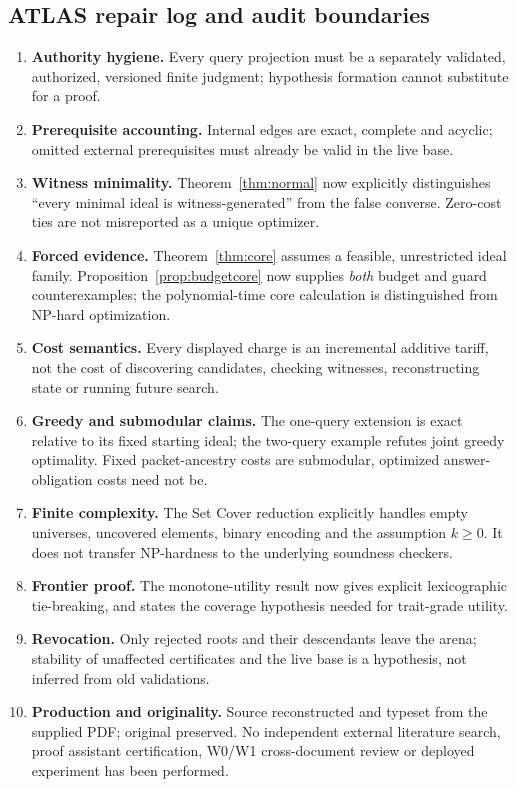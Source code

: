 \documentclass[10pt,letterpaper]{article}
\theoremstyle{definition}
\theoremstyle{remark}
\begin{document}
\subsection{ATLAS repair log and audit boundaries}
\begin{enumerate}[leftmargin=*,label=\arabic*.]
\item \textbf{Authority hygiene.} Every query projection must be a separately validated, authorized, versioned finite judgment; hypothesis formation cannot substitute for a proof.
\item \textbf{Prerequisite accounting.} Internal edges are exact, complete and acyclic; omitted external prerequisites must already be valid in the live base.
\item \textbf{Witness minimality.} Theorem~\ref{thm:normal} now explicitly distinguishes ``every minimal ideal is witness-generated'' from the false converse. Zero-cost ties are not misreported as a unique optimizer.
\item \textbf{Forced evidence.} Theorem~\ref{thm:core} assumes a feasible, unrestricted ideal family. Proposition~\ref{prop:budgetcore} now supplies \emph{both} budget and guard counterexamples; the polynomial-time core calculation is distinguished from NP-hard optimization.
\item \textbf{Cost semantics.} Every displayed charge is an incremental additive tariff, not the cost of discovering candidates, checking witnesses, reconstructing state or running future search.
\item \textbf{Greedy and submodular claims.} The one-query extension is exact relative to its fixed starting ideal; the two-query example refutes joint greedy optimality. Fixed packet-ancestry costs are submodular, optimized answer-obligation costs need not be.
\item \textbf{Finite complexity.} The Set Cover reduction explicitly handles empty universes, uncovered elements, binary encoding and the assumption $k\ge0$. It does not transfer NP-hardness to the underlying soundness checkers.
\item \textbf{Frontier proof.} The monotone-utility result now gives explicit lexicographic tie-breaking, and states the coverage hypothesis needed for trait-grade utility.
\item \textbf{Revocation.} Only rejected roots and their descendants leave the arena; stability of unaffected certificates and the live base is a hypothesis, not inferred from old validations.
\item \textbf{Production and originality.} Source reconstructed and typeset from the supplied PDF; original preserved. No independent external literature search, proof assistant certification, W0/W1 cross-document review or deployed experiment has been performed.
\end{enumerate}
\end{document}
